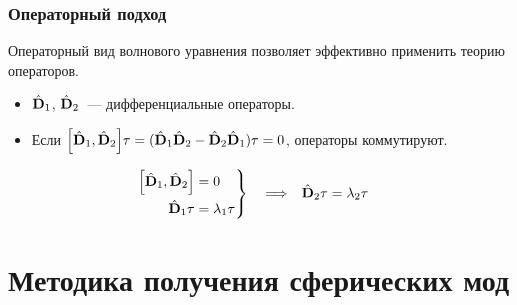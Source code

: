\documentclass[compress]{beamer}
\begin{document}

    \begin{frame}\frametitle{Операторный подход}

        Операторный вид волнового уравнения позволяет эффективно применить теорию операторов.

        \begin{itemize}\justifying

            \item $\hat{\mathbf{D}}_1$, $\hat{\mathbf{D}}_2$~--- дифференциальные операторы.

            \item Если $\qty[\hat{\mathbf{D}}_1, \hat{\mathbf{D}}_2] \tau = (\hat{\mathbf{D}}_1\hat{\mathbf{D}}_2 - \hat{\mathbf{D}}_2\hat{\mathbf{D}}_1) \tau = 0$, операторы коммутируют.

        \end{itemize}

        \begin{align*}
            \left. \begin{aligned}
                \qty[\hat{\mathbf{D}}_1, \hat{\mathbf{D}}_2] &= 0 \\
                \hat{\mathbf{D}}_1 \tau &= \lambda_1 \tau
            \end{aligned} \right\}
            \quad \Longrightarrow \quad &
            \hat{\mathbf{D}}_2 \tau = \lambda_2 \tau
        \end{align*}

    \end{frame}


    \section[Методика]{Методика получения сферических мод}

\end{document}
